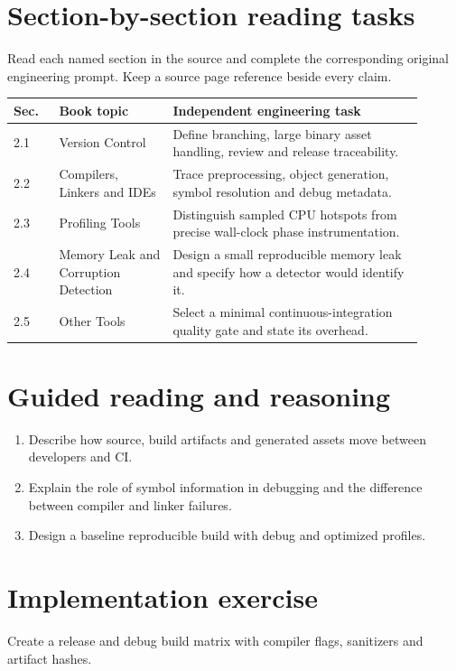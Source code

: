 \documentclass[11pt,letterpaper]{article}
\begin{document}
\section{Section-by-section reading tasks}
Read each named section in the source and complete the corresponding original engineering prompt. Keep a source page reference beside every claim.
\small\begin{longtable}{|p{0.10\linewidth}|p{0.25\linewidth}|p{0.55\linewidth}|}
\hline \textbf{Sec.} & \textbf{Book topic} & \textbf{Independent engineering task} \\ \hline\endhead
2.1 & Version Control & Define branching, large binary asset handling, review and release traceability. \\ \hline
2.2 & Compilers, Linkers and IDEs & Trace preprocessing, object generation, symbol resolution and debug metadata. \\ \hline
2.3 & Profiling Tools & Distinguish sampled CPU hotspots from precise wall-clock phase instrumentation. \\ \hline
2.4 & Memory Leak and Corruption Detection & Design a small reproducible memory leak and specify how a detector would identify it. \\ \hline
2.5 & Other Tools & Select a minimal continuous-integration quality gate and state its overhead. \\ \hline
\end{longtable}\normalsize
\section{Guided reading and reasoning}
\begin{enumerate}
\item Describe how source, build artifacts and generated assets move between developers and CI.
\item Explain the role of symbol information in debugging and the difference between compiler and linker failures.
\item Design a baseline reproducible build with debug and optimized profiles.
\end{enumerate}
\section{Implementation exercise}
Create a release and debug build matrix with compiler flags, sanitizers and artifact hashes.
\end{document}
